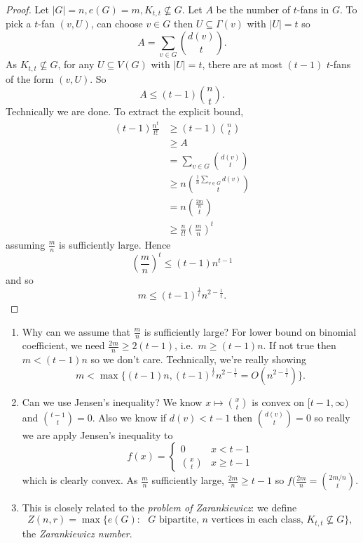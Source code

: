 \documentclass[a4paper]{article}
\begin{document}
\begin{proof}
  Let \(|G| = n, e(G) = m, K_{t, t} \nsubseteq G\). Let \(A\) be the number of \(t\)-fans in \(G\). To pick a \(t\)-fan \((v, U)\), can choose \(v \in G\) then \(U \subseteq \Gamma(v)\) with \(|U| = t\) so
  \[
    A = \sum_{v \in G} \binom{d(v)}{t}.
  \]
  As \(K_{t, t} \nsubseteq G\), for any \(U \subseteq V(G)\) with \(|U| = t\), there are at most \((t - 1)\) \(t\)-fans of the form \((v, U)\). So
  \[
    A \leq (t - 1) \binom{n}{t}.
  \]
  Technically we are done. To extract the explicit bound,
  \begin{align*}
    (t - 1) \frac{n^t}{t!}
    &\geq (t - 1) \binom{n}{t} \\
    &\geq A \\
    &= \sum_{v \in G} \binom{d(v)}{t} \\
    &\geq n \binom{\frac{1}{n} \sum_{v \in G} d(v)}{t} \\
    &= n \binom{\frac{2m}{n}}{t} \\
    &\geq \frac{n}{t!} \left(\frac{m}{n}\right)^t
  \end{align*}
  assuming \(\frac{m}{n}\) is sufficiently large. Hence
  \[
    \left( \frac{m}{n} \right)^t \leq (t - 1) n^{t - 1}
  \]
  and so
  \[
    m \leq (t - 1)^{\frac{1}{t}} n^{2 - \frac{1}{t}}.
  \]
\end{proof}

\begin{remark}\leavevmode
  \begin{enumerate}
  \item Why can we assume that \(\frac{m}{n}\) is sufficiently large? For lower bound on binomial coefficient, we need \(\frac{2m}{n} \geq 2(t - 1)\), i.e.\ \(m \geq (t - 1) n\). If not true then \(m < (t - 1)n\) so we don't care. Technically, we're really showing
    \[
      m < \max\{(t - 1)n , (t - 1)^{\frac{1}{t}} n^{2 - \frac{1}{t}} = O(n^{2 - \frac{1}{t}})\}.
    \]
  \item Can we use Jensen's inequality? We know \(x \mapsto \binom{x}{t}\) is convex on \([t - 1, \infty)\) and \(\binom{t - 1}{t} = 0\). Also we know if \(d(v) < t - 1\) then \(\binom{d(v)}{t} = 0\) so really we are apply Jensen's inequality to
    \[
      f(x) =
      \begin{cases}
        0 & x < t - 1 \\
        \binom{x}{t} & x \geq t - 1
      \end{cases}
    \]
    which is clearly convex. As \(\frac{m}{n}\) sufficiently large, \(\frac{2m}{n} \geq t - 1\) so \(f(\frac{2m}{n} = \binom{2m/n}{t}\).
\item This is closely related to the \emph{problem of Zarankiewicz}: we define
  \[
    Z(n, r) = \max \{e(G): \text{ \(G\) bipartite, \(n\) vertices in each class, \(K_{t, t} \nsubseteq G\)}\},
  \]
  the \emph{Zarankiewicz number}.
  \end{enumerate}
\end{remark}
\end{document}
